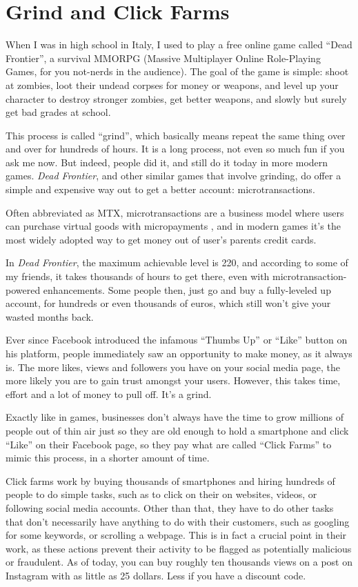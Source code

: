 \section{Grind and Click Farms}
\label{chap:clickfarms}

When I was in high school in Italy, I used to play a free online game called ``Dead Frontier'', a survival MMORPG (Massive Multiplayer Online Role-Playing Games, for you not-nerds in the audience). The goal of the game is simple: shoot at zombies, loot their undead corpses for money or weapons, and level up your character to destroy stronger zombies, get better weapons, and slowly but surely get bad grades at school.

This process is called ``grind'', which basically means repeat the same thing over and over for hundreds of hours. It is a long process, not even so much fun if you ask me now. But indeed, people did it, and still do it today in more modern games. \textit{Dead Frontier}, and other similar games that involve grinding, do offer a simple and expensive way out to get a better account: microtransactions.

Often abbreviated as MTX, microtransactions are a business model where users can purchase virtual goods with micropayments \cite{microtransaction_2021}, and in modern games it's the most widely adopted way to get money out of user's parents credit cards.

In \textit{Dead Frontier}, the maximum achievable level is 220, and according to some of my friends, it takes thousands of hours to get there, even with microtransaction-powered enhancements. Some people then, just go and buy a fully-leveled up account, for hundreds or even thousands of euros, which still won't give your wasted months back.

Ever since Facebook introduced the infamous ``Thumbs Up'' or ``Like'' button on his platform, people immediately saw an opportunity to make money, as it always is. The more likes, views and followers you have on your social media page, the more likely you are to gain trust amongst your users. However, this takes time, effort and a lot of money to pull off. It's a grind.

Exactly like in games, businesses don't always have the time to grow millions of people out of thin air just so they are old enough to hold a smartphone and click ``Like'' on their Facebook page, so they pay what are called ``Click Farms'' to mimic this process, in a shorter amount of time.

Click farms work by buying thousands of smartphones and hiring hundreds of people to do simple tasks, such as to click on their on websites, videos, or following social media accounts. Other than that, they have to do other tasks that don't necessarily have anything to do with their customers, such as googling for some keywords, or scrolling a webpage. This is in fact a crucial point in their work, as these actions prevent their activity to be flagged as potentially malicious or fraudulent. As of today, you can buy roughly ten thousands views on a post on Instagram with as little as 25 dollars. Less if you have a discount code.

